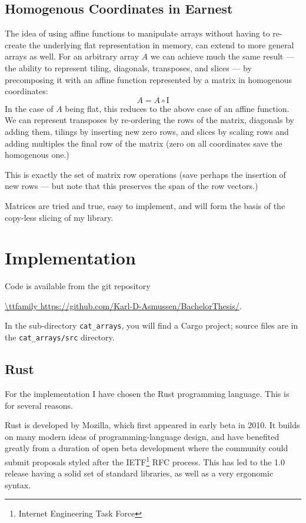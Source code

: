 \documentclass{DIKU-report-variant}
\newcommand\mrm[1]{\mathrm{#1}}
\newcommand\brm[1]{\bm{\mrm{#1}}}
\begin{document}
\section{Homogenous Coordinates in Earnest}

The idea of using affine functions to manipulate arrays without having to re-create the underlying flat
representation in memory, can extend to more general arrays as well. For an arbitrary array \(A\) we can
achieve much the same result --- the ability to represent tiling, diagonals, transposes, and slices ---
by precomposing it with an affine function represented by a matrix in homogenous coordinates:
\[ A = A \circ \brm I \]
In the case of \(A\) being flat, this reduces to the above case of an affine function.
We can represent transposes by re-ordering the rows of the matrix, diagonals by adding them, tilings by
inserting new zero rows, and slices by scaling rows and adding multiples the final row of the matrix (zero
on all coordinates save the homogenous one.)

This is exactly the set of matrix row operations (save perhaps the insertion of new rows --- but note that
this preserves the span of the row vectors.)

Matrices are tried and true, easy to implement, and will form the basis of the copy-less slicing of my library.

\chapter{Implementation}

Code is available from the git repository
\begin{center}
\url{\ttfamily https://github.com/Karl-D-Asmussen/BachelorThesis/}.
\end{center}
In the sub-directory \texttt{cat\_arrays}, you will find a Cargo project;
source files are in the \texttt{cat\_arrays/src} directory.

\section{Rust}

For the implementation I have chosen the Rust programming language. This
is for several reasons.

Rust is developed by Mozilla, which first appeared in early beta in 2010. It
builds on many modern ideas of programming-language design, and have benefited
greatly from a duration of open beta development where the community could submit
proposals styled after the IETF\footnote{Internet Engineering Task Force}
RFC process. This has led to the 1.0 release having a solid set of standard libraries,
as well as a very ergonomic syntax.
\end{document}
